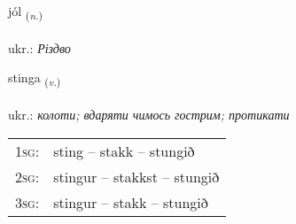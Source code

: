 \documentclass[frontgrid, backgrid]{flacards}\usepackage[]{graphicx}\usepackage[]{xcolor}
\begin{document}
\renewcommand{\flhead}{\vskip5pt \fboxsep=0pt {\small\bfseries\footnotesize Nafnorð | іменник}}
\renewcommand{\fcfoot}{\vskip5pt \fboxsep=0pt \hspace{2pt}{\small\bfseries\footnotesize 2K}}

\renewcommand{\blhead}{\vskip5pt {\small\bfseries\footnotesize Nafnorð | іменник }}
\renewcommand{\bcfoot}{\vskip5pt \hspace{2pt}{\small\bfseries\footnotesize 2K}}


{jól \small{\textsubscript{(\textit{n.})}} \\[1ex] %
\textphonetic{[jouːl]} \\
ukr.: \emph{Різдво} \\  [2ex]
\renewcommand*{\arraystretch}{0.8}
}

\renewcommand{\flhead}{\vskip5pt \fboxsep=0pt {\small\bfseries\footnotesize Sagnorð | дієслово}}
\renewcommand{\fcfoot}{\vskip5pt \fboxsep=0pt \hspace{2pt}{\small\bfseries\footnotesize 2K}}

\renewcommand{\blhead}{\vskip5pt {\small\bfseries\footnotesize Sagnorð | дієслово }}
\renewcommand{\bcfoot}{\vskip5pt \hspace{2pt}{\small\bfseries\footnotesize 2K}}


{stinga \small{\textsubscript{(\textit{v.})}} \\[1ex] %
\textphonetic{[stiŋka]} \\
ukr.: \emph{колоти; вдаряти чимось гострим; протикати} \\  [2ex]
\renewcommand*{\arraystretch}{0.8}
\begin{tabular}{p{1cm}l}
\textsc{1sg}: & sting -- stakk -- stungið \\ 
\textsc{2sg}: & stingur -- stakkst -- stungið \\ 
\textsc{3sg}: & stingur -- stakk -- stungið \\ 
\end{tabular}
}
\end{document}
